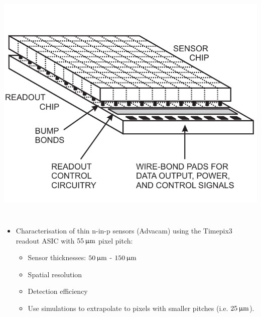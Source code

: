 \begin{frame}
\begin{columns}
    \includegraphics[width=\textwidth]{figures/hybridDet.pdf}





  \end{columns}


  \begin{columns}
    \begin{itemize}
    \item Characterisation of thin n-in-p sensors (Advacam) using the
      Timepix3 readout ASIC with \textcolor{Blue}{$55\,\upmu\mathrm{m}$} pixel
      pitch:
      \begin{itemize}
      \item Sensor thicknesses: $50\,\upmu\mathrm{m}$ - $150\,\upmu\mathrm{m}$
      \item Spatial resolution
      \item Detection efficiency
      \item Use simulations to extrapolate to pixels with smaller
        pitches (i.e. $25\,\upmu\mathrm{m}$).
      \end{itemize}
    \end{itemize}


\end{columns}
\end{frame}
